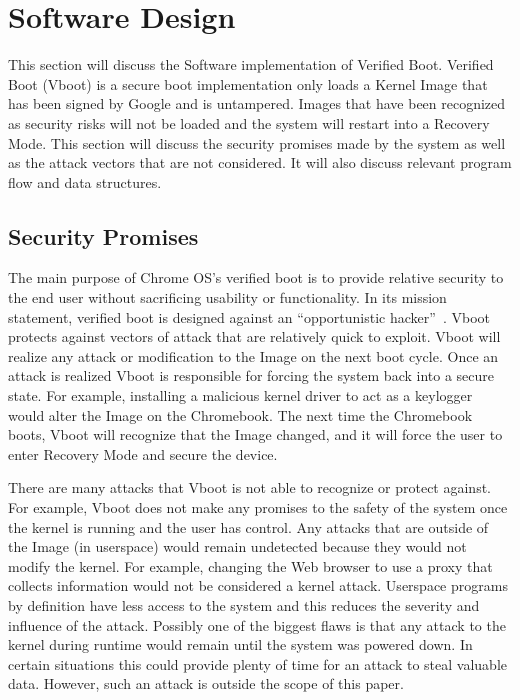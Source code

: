 \chapter{Software Design}

This section will discuss the Software implementation of Verified
Boot. 
Verified Boot (Vboot) is a secure boot implementation only loads a
Kernel Image that has been signed by Google and is untampered.
Images that have been recognized as security risks will not be loaded and the system will restart into a Recovery Mode.
This section will discuss the security promises made by the system as well
as the attack vectors that are not considered.
It will also discuss relevant program flow and data structures.

\section{Security Promises}

The main purpose of Chrome OS's verified boot is to provide relative security to the end user without sacrificing usability or functionality. 
In its mission statement, verified boot is designed against an ``opportunistic hacker''~\cite{vboot-design-doc}.
Vboot protects against vectors of attack that are relatively quick to exploit.
Vboot will realize any attack or modification to the Image on the next boot cycle.
Once an attack is realized Vboot is responsible for forcing the system back into
a secure state.
For example, installing a malicious kernel driver to act as a keylogger would
alter the Image on the Chromebook.
The next time the Chromebook boots, Vboot will recognize that the Image changed,
and it will force the user to enter Recovery Mode and secure the device. 

There are many attacks that Vboot is not able to recognize or protect against.
For example, Vboot does not make any promises to the safety of the system once the kernel is running and the user has control. 
Any attacks that are outside of the Image (in userspace) would remain
undetected because they would not modify the kernel.
For example, changing the Web browser to use a proxy that collects information
would not be considered a kernel attack.
Userspace programs by definition have less access to the system and this reduces the severity and influence of the attack.
Possibly one of the biggest flaws is that any attack to the kernel during
runtime would remain until the system was powered down.
In certain situations this could provide plenty of time for an attack to steal valuable data.
However, such an attack is outside the scope of this paper.

